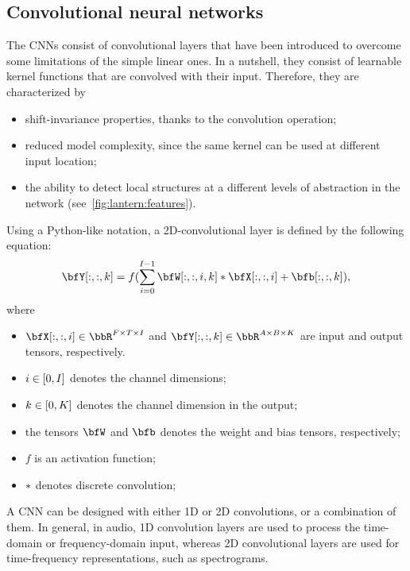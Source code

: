 \subsection{Convolutional neural networks}\label{subsec:lantern:cnn}
The \acp{CNN} consist of convolutional layers that have been introduced to overcome some limitations of the simple linear ones.
In a nutshell, they consist of learnable kernel functions that are convolved with their input.
Therefore, they are characterized by
\begin{itemize}
    \item shift-invariance properties, thanks to the convolution operation;
    \item reduced model complexity, since the same kernel can be used at different input location;
    \item the ability to detect local structures at a different levels of abstraction in the network (see~\cref{fig:lantern:features}).
\end{itemize}
Using a Python-like notation, a 2D-convolutional layer is defined by the following equation:
\begin{equation*}
    \bfY[:,:,k] = f( \sum_{i=0}^{I-1} \bfW[:,:,i,k] \convDis \bfX[:,:,i] + \bfb[:,:,k])
    ,
\end{equation*}
where
\begin{itemize}
    \item $\bfX[:,:,i]\in\bbR^{F \times T \times I}$ and $\bfY[:,:,k]\in\bbR^{A \times B \times K}$ are input and output tensors, respectively.
    \item $i\in\klist{0,I}$ denotes the channel dimensions;
    \item $k\in\klist{0,K}$ denotes the channel dimension in the output;
    \item the tensors $\bfW$ and $\bfb$ denotes the weight and bias tensors, respectively;
    \item $f$ is an activation function;
    \item $\ast$ denotes discrete convolution;
\end{itemize}
A \ac{CNN} can be designed with either 1D or 2D convolutions, or a combination of them.
In general, in audio, 1D convolution layers are used to process the time-domain or frequency-domain input, whereas 2D convolutional layers are used for time-frequency representations, such as spectrograms.
